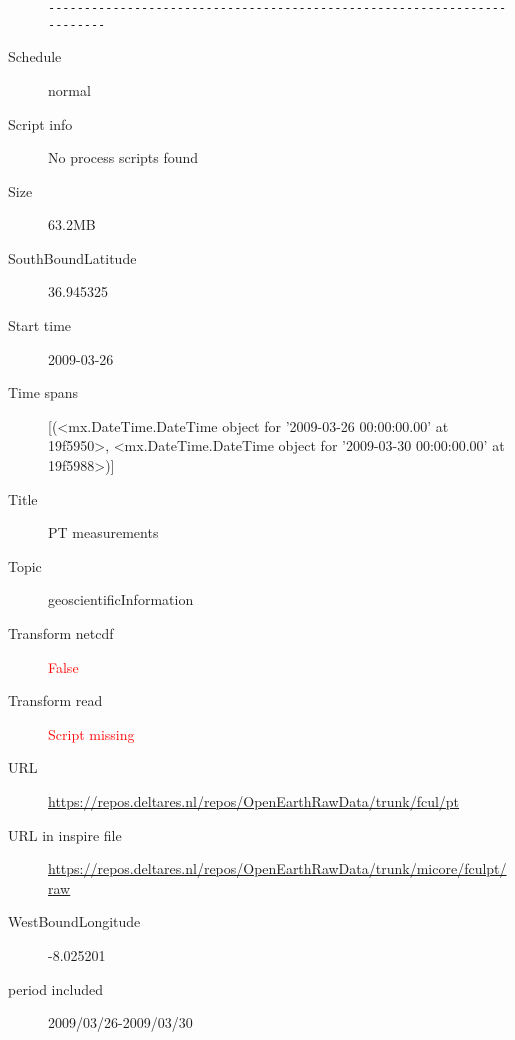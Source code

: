 \documentclass[9]{report}
\begin{document}
\begin{description}
\begin{verbatim}
------------------------------------------------------------------------

\end{verbatim}
  \item[Schedule] normal
  \item[Script info] No process scripts found
  \item[Size] 63.2MB
  \item[SouthBoundLatitude] 36.945325
  \item[Start time] 2009-03-26
  \item[Time spans] [(<mx.DateTime.DateTime object for '2009-03-26 00:00:00.00' at 19f5950>, <mx.DateTime.DateTime object for '2009-03-30 00:00:00.00' at 19f5988>)]
  \item[Title]  PT measurements 
  \item[Topic] geoscientificInformation
  \item[Transform netcdf] \textcolor{red}{False}
  \item[Transform read] \textcolor{red}{Script missing}
  \item[URL] \href{https://repos.deltares.nl/repos/OpenEarthRawData/trunk/fcul/pt}{https://repos.deltares.nl/repos/OpenEarthRawData/trunk/fcul/pt}
  \item[URL in inspire file] \href{https://repos.deltares.nl/repos/OpenEarthRawData/trunk/micore/fculpt/raw}{https://repos.deltares.nl/repos/OpenEarthRawData/trunk/micore/fculpt/raw}
  \item[WestBoundLongitude] -8.025201
  \item[period included] 2009/03/26-2009/03/30
\end{description}
\end{document}
